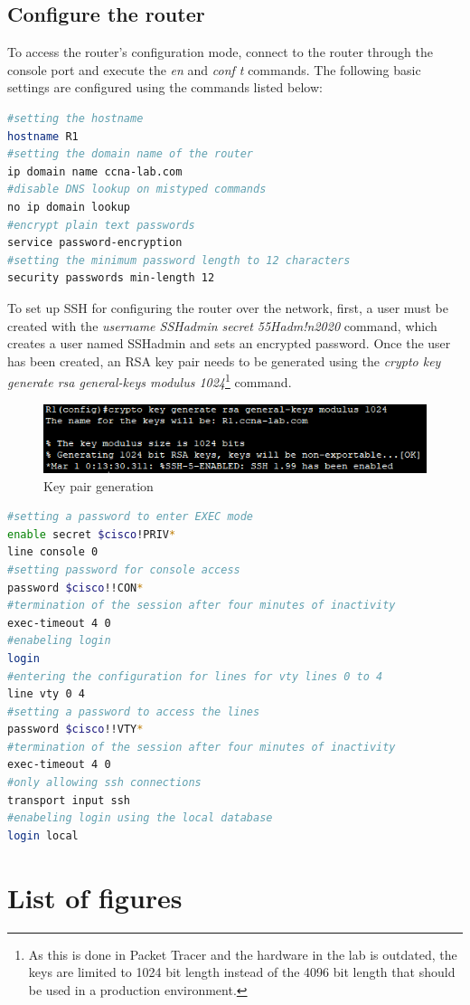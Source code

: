 \documentclass[a4paper]{article}
\newcommand{\abc}{\hfill \break}
\newcommand{\ii}{\textit}
\begin{document}
\subsection{Configure the router}
To access the router's configuration mode, connect to the router through the console port and execute the \ii{en} and \ii{conf t} commands.\abc
The following basic settings are configured using the commands listed below:
\begin{lstlisting}[language=bash,
	keywordstyle=\color{black},
	rulecolor=\color{blue}]
#setting the hostname
hostname R1
#setting the domain name of the router
ip domain name ccna-lab.com
#disable DNS lookup on mistyped commands
no ip domain lookup
#encrypt plain text passwords
service password-encryption
#setting the minimum password length to 12 characters
security passwords min-length 12
\end{lstlisting}
To set up SSH for configuring the router over the network, first, a user must be created with the \ii{username SSHadmin secret 55Hadm!n2020} command, which creates a user named SSHadmin and sets an encrypted password.\abc
Once the user has been created, an RSA key pair needs to be generated using the \ii{crypto key generate rsa general-keys modulus 1024}\footnote{As this is done in Packet Tracer and the hardware in the lab is outdated, the keys are limited to 1024 bit length instead of the 4096 bit length that should be used in a production environment.} command.

\begin{figure}[h]
	\includegraphics[scale=0.55]{images/keygen.png}
	\centering
	\caption{Key pair generation}
\end{figure}
\begin{lstlisting}[language=bash,
	keywordstyle=\color{black},
	rulecolor=\color{blue}]
#setting a password to enter EXEC mode
enable secret $cisco!PRIV*
line console 0
#setting password for console access
password $cisco!!CON*
#termination of the session after four minutes of inactivity
exec-timeout 4 0
#enabeling login 
login
#entering the configuration for lines for vty lines 0 to 4
line vty 0 4
#setting a password to access the lines
password $cisco!!VTY*
#termination of the session after four minutes of inactivity
exec-timeout 4 0
#only allowing ssh connections
transport input ssh
#enabeling login using the local database
login local
\end{lstlisting}



\newpage
\section{List of figures}

\listoffigures
\end{document}
